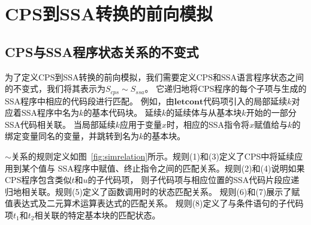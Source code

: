 \section{CPS到SSA转换的前向模拟} \label{sec:cpsssaforward}

\subsection{CPS与SSA程序状态关系的不变式}

为了定义CPS到SSA转换的前向模拟，我们需要定义CPS和SSA语言程序状态之间的不变式，我们将其表示为$S_{cps} \sim S_{ssa}$。
它递归地将CPS程序的每个子项与生成的SSA程序中相应的代码段进行匹配。
例如，由$\mathbf{letcont}$代码项引入的局部延续$k$对应着SSA程序中名为$k$的基本代码块。
延续$k$的延续体与从基本块$k$开始的一部分SSA代码相关联。
当局部延续$k$应用于变量$x$时，相应的SSA指令将$x$赋值给与$k$的绑定变量同名的变量，并跳转到名为$k$的基本块。

$\sim$关系的规则定义如图~\ref{fig:simrelation}所示。规则(1)和(3)定义了CPS中将延续应用到某个值与
SSA程序中赋值、终止指令之间的匹配关系。规则(2)和(4)说明如果CPS程序包含类似$t$和$u$的子代码项，
则子代码项与相应位置的SSA代码片段应递归地相关联。规则(5)定义了函数调用时的状态匹配关系。
规则(6)和(7)展示了赋值表达式及二元算术运算表达式的匹配关系。
规则(8)定义了与条件语句的子代码项$t_1$和$t_2$相关联的特定基本块的匹配状态。

